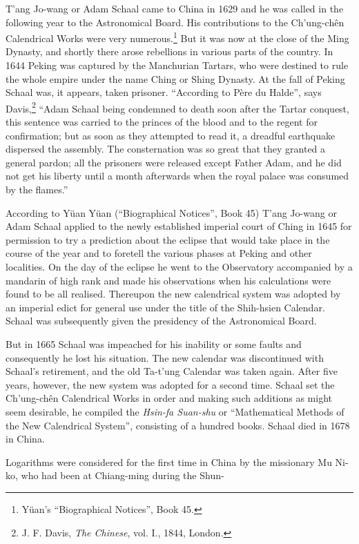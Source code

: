 \documentclass[11pt]{article}
\newcommand{\scanpage}[2]{\clearpage\setcounter{footnote}{0}\noindent{\footnotesize\color{gray}PDF page #1 · #2}\par\medskip}
\newcommand{\scanfooter}{}
\begin{document}
\scanpage{0129}{Chapter 17, printed page 115}
\setcounter{footnote}{0}
T'ang Jo-wang or Adam Schaal came to China in 1629 and he was called in the following year to the Astronomical Board. His contributions to the Ch'ung-chên Calendrical Works were very numerous.\footnote{Yüan's ``Biographical Notices'', Book 45.} But it was now at the close of the Ming Dynasty, and shortly there arose rebellions in various parts of the country. In 1644 Peking was captured by the Manchurian Tartars, who were destined to rule the whole empire under the name Ching or Shing Dynasty. At the fall of Peking Schaal was, it appears, taken prisoner. ``According to Père du Halde'', says Davis,\footnote{J. F. Davis, \emph{The Chinese}, vol. I., 1844, London.} ``Adam Schaal being condemned to death soon after the Tartar conquest, this sentence was carried to the princes of the blood and to the regent for confirmation; but as soon as they attempted to read it, a dreadful earthquake dispersed the assembly. The consternation was so great that they granted a general pardon; all the prisoners were released except Father Adam, and he did not get his liberty until a month afterwards when the royal palace was consumed by the flames.''

According to Yüan Yüan (``Biographical Notices'', Book 45) T'ang Jo-wang or Adam Schaal applied to the newly established imperial court of Ching in 1645 for permission to try a prediction about the eclipse that would take place in the course of the year and to foretell the various phases at Peking and other localities. On the day of the eclipse he went to the Observatory accompanied by a mandarin of high rank and made his observations when his calculations were found to be all realised. Thereupon the new calendrical system was adopted by an imperial edict for general use under the title of the Shih-hsien Calendar. Schaal was subsequently given the presidency of the Astronomical Board.

But in 1665 Schaal was impeached for his inability or some faults and consequently he lost his situation. The new calendar was discontinued with Schaal's retirement, and the old Ta-t'ung Calendar was taken again. After five years, however, the new system was adopted for a second time. Schaal set the Ch'ung-chên Calendrical Works in order and making such additions as might seem desirable, he compiled the \emph{Hsin-fa Suan-shu} or ``Mathematical Methods of the New Calendrical System'', consisting of a hundred books. Schaal died in 1678 in China.

Logarithms were considered for the first time in China by the missionary Mu Ni-ko, who had been at Chiang-ming during the Shun-
\scanfooter
\end{document}
